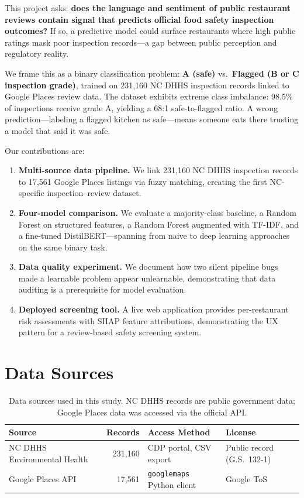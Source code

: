 \documentclass{article}
\begin{document}
This project asks: \textbf{does the language and sentiment of public restaurant reviews contain signal that predicts official food safety inspection outcomes?} If so, a predictive model could surface restaurants where high public ratings mask poor inspection records---a gap between public perception and regulatory reality.

We frame this as a binary classification problem: \textbf{A (safe)} vs.\ \textbf{Flagged (B or C inspection grade)}, trained on 231,160 NC DHHS inspection records linked to Google Places review data. The dataset exhibits extreme class imbalance: 98.5\% of inspections receive grade A, yielding a 68:1 safe-to-flagged ratio. A wrong prediction---labeling a flagged kitchen as safe---means someone eats there trusting a model that said it was safe.

Our contributions are:
\begin{enumerate}
    \item \textbf{Multi-source data pipeline.} We link 231,160 NC DHHS inspection records to 17,561 Google Places listings via fuzzy matching, creating the first NC-specific inspection--review dataset.
    \item \textbf{Four-model comparison.} We evaluate a majority-class baseline, a Random Forest on structured features, a Random Forest augmented with TF-IDF, and a fine-tuned DistilBERT---spanning from naive to deep learning approaches on the same binary task.
    \item \textbf{Data quality experiment.} We document how two silent pipeline bugs made a learnable problem appear unlearnable, demonstrating that data auditing is a prerequisite for model evaluation.
    \item \textbf{Deployed screening tool.} A live web application provides per-restaurant risk assessments with SHAP feature attributions, demonstrating the UX pattern for a review-based safety screening system.
\end{enumerate}

\section{Data Sources}

\begin{table}[h]
\centering
\caption{Data sources used in this study. NC DHHS records are public government data; Google Places data was accessed via the official API.}
\label{tab:data_sources}
\begin{tabular}{lrll}
\toprule
\textbf{Source} & \textbf{Records} & \textbf{Access Method} & \textbf{License} \\
\midrule
NC DHHS Environmental Health & 231,160 & CDP portal, CSV export & Public record (G.S.\ 132-1) \\
Google Places API & 17,561 & \texttt{googlemaps} Python client & Google ToS \\
\bottomrule
\end{tabular}
\end{table}
\end{document}
